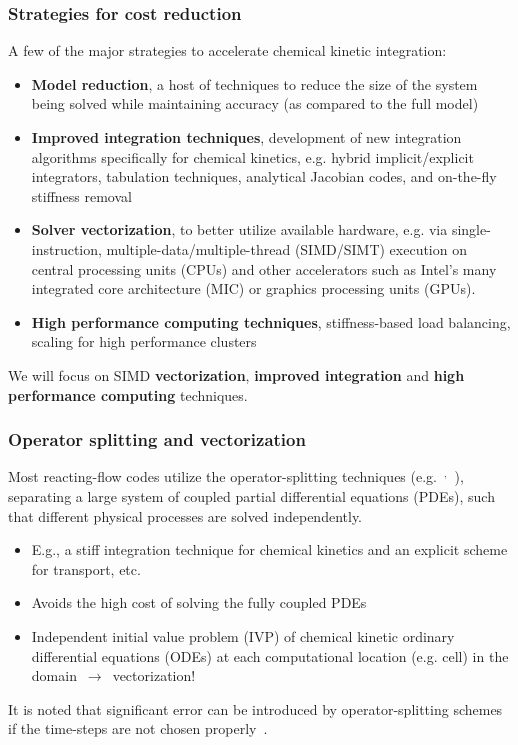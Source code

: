 \documentclass{beamer}
\newcounter{expensive}
\newcommand\ExpTitle{%
  \frametitle{\refstepcounter{expensive}{Chemical kinetic integration is \textbf{expensive}}~\theexpensive}}
\newcounter{stiff}
\begin{document}


\begin{frame}
 \frametitle{Strategies for cost reduction}
 A few of the major strategies to accelerate chemical kinetic integration:
 \begin{itemize}
  \item \textbf{Model reduction}, a host of techniques to reduce the size of the system being solved while maintaining accuracy (as compared to the full model)
  \item \textbf{Improved integration techniques}, development of new integration algorithms specifically for chemical kinetics, e.g. hybrid implicit\slash explicit integrators, tabulation techniques, analytical Jacobian codes, and on-the-fly stiffness removal
  \item \textbf{Solver vectorization}, to better utilize available hardware, e.g. via single-instruction, multiple-data\slash multiple-thread (SIMD\slash SIMT) execution on central processing units (CPUs) and other accelerators such as Intel's many integrated core architecture (MIC) or graphics processing units (GPUs).
  \item \textbf{High performance computing techniques}, stiffness-based load balancing, scaling for high performance clusters
 \end{itemize}
 We will focus on SIMD \textbf{vectorization}, \textbf{improved integration} and \textbf{high performance computing} techniques.
\end{frame}

\begin{frame}
 \frametitle{Operator splitting and vectorization}
 Most reacting-flow codes utilize the operator-splitting techniques (e.g.~$^{,}$~), separating a large system of coupled partial differential equations (PDEs), such that different physical processes are solved independently.
 \begin{itemize}
  \item E.g., a stiff integration technique for chemical kinetics and an explicit scheme for transport, etc.
  \item Avoids the high cost of solving the fully coupled PDEs
  \item Independent initial value problem (IVP) of chemical kinetic ordinary differential equations (ODEs) at each computational location (e.g. cell) in the domain~$\rightarrow$~vectorization!
 \end{itemize}
 It is noted that significant error can be introduced by operator-splitting schemes if the time-steps are not chosen properly~.
\end{frame}
\end{document}
